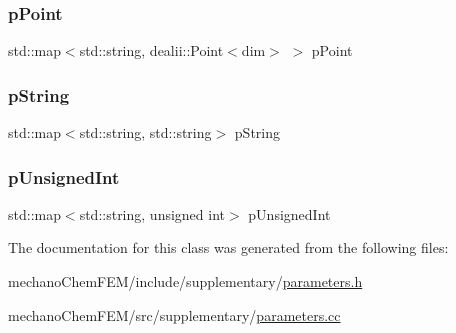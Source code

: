 \mbox{\label{classparameters_class_a619a83b172e412339a12ea402580662c}} 
\subsubsection{\texorpdfstring{pPoint}{pPoint}}
{\footnotesize\ttfamily std\+::map$<$std\+::string, dealii\+::\+Point$<$dim$>$ $>$ p\+Point\hspace{0.3cm}{\ttfamily [private]}}

\mbox{\label{classparameters_class_a3453601308e73bcc0f45ed6ea8a9959b}} 
\subsubsection{\texorpdfstring{pString}{pString}}
{\footnotesize\ttfamily std\+::map$<$std\+::string, std\+::string$>$ p\+String\hspace{0.3cm}{\ttfamily [private]}}

\mbox{\label{classparameters_class_a997bcb31fee3242f776c7e05d709ce12}} 
\subsubsection{\texorpdfstring{pUnsignedInt}{pUnsignedInt}}
{\footnotesize\ttfamily std\+::map$<$std\+::string, unsigned int$>$ p\+Unsigned\+Int\hspace{0.3cm}{\ttfamily [private]}}



The documentation for this class was generated from the following files\+:\begin{DoxyCompactItemize}
\item 
mechano\+Chem\+F\+E\+M/include/supplementary/\mbox{\hyperlink{parameters_8h}{parameters.\+h}}\item 
mechano\+Chem\+F\+E\+M/src/supplementary/\mbox{\hyperlink{parameters_8cc}{parameters.\+cc}}\end{DoxyCompactItemize}
